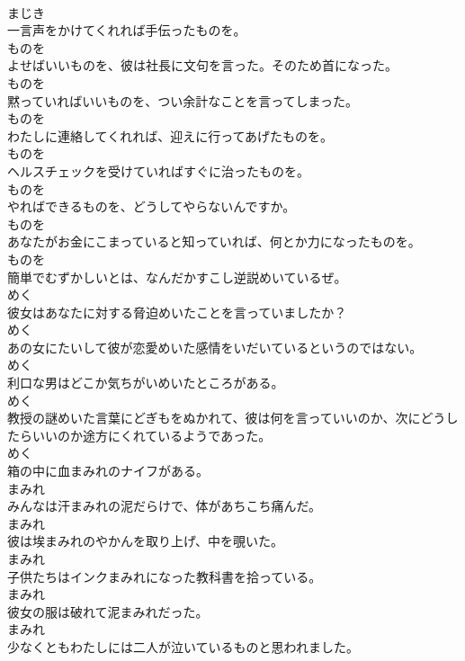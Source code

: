 \documentclass[8pt]{extreport}
\begin{document}
\begin{CJK}{UTF8}{min}
\\	まじき	
\\	一言声をかけてくれれば手伝ったものを。	
\\	ものを	
\\	よせばいいものを、彼は社長に文句を言った。そのため首になった。	
\\	ものを	
\\	黙っていればいいものを、つい余計なことを言ってしまった。	
\\	ものを	
\\	わたしに連絡してくれれば、迎えに行ってあげたものを。	
\\	ものを	
\\	ヘルスチェックを受けていればすぐに治ったものを。	
\\	ものを	
\\	やればできるものを、どうしてやらないんですか。	
\\	ものを	
\\	あなたがお金にこまっていると知っていれば、何とか力になったものを。	
\\	ものを	
\\	簡単でむずかしいとは、なんだかすこし逆説めいているぜ。	
\\	めく	
\\	彼女はあなたに対する脅迫めいたことを言っていましたか？	
\\	めく	
\\	あの女にたいして彼が恋愛めいた感情をいだいているというのではない。	
\\	めく	
\\	利口な男はどこか気ちがいめいたところがある。	
\\	めく	
\\	教授の謎めいた言葉にどぎもをぬかれて、彼は何を言っていいのか、次にどうしたらいいのか途方にくれているようであった。	
\\	めく	
\\	箱の中に血まみれのナイフがある。	
\\	まみれ	
\\	みんなは汗まみれの泥だらけで、体があちこち痛んだ。	
\\	まみれ	
\\	彼は埃まみれのやかんを取り上げ、中を覗いた。	
\\	まみれ	
\\	子供たちはインクまみれになった教科書を拾っている。	
\\	まみれ	
\\	彼女の服は破れて泥まみれだった。	
\\	まみれ	
\\	少なくともわたしには二人が泣いているものと思われました。	

\end{CJK}
\end{document}
